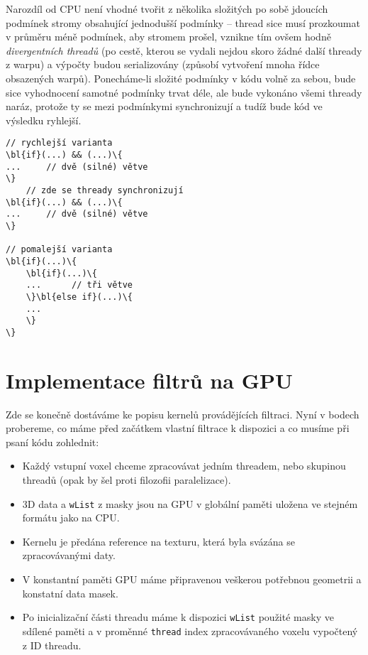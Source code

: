         Narozdíl od CPU není vhodné tvořit z několika složitých po sobě jdoucích podmínek stromy obsahující jednodušší podmínky -- thread sice musí prozkoumat v průměru méně podmínek, aby stromem prošel, vznikne tím ovšem hodně \emph{divergentních threadů} (po cestě, kterou se vydali nejdou skoro žádné další thready z warpu) a výpočty budou serializovány (způsobí vytvoření mnoha řídce obsazených warpů). Ponecháme-li složité podmínky v kódu volně za sebou, bude sice vyhodnocení samotné podmínky trvat déle, ale bude vykonáno všemi thready naráz, protože ty se mezi podmínkymi synchronizují a tudíž bude kód ve výsledku ryhlejší.
        \begin{Verbatim}[commandchars = \\\{\}]
// rychlejší varianta
\bl{if}(...) && (...)\{
...     // dvě (silné) větve
\}
    // zde se thready synchronizují
\bl{if}(...) && (...)\{
...     // dvě (silné) větve
\}

// pomalejší varianta
\bl{if}(...)\{
    \bl{if}(...)\{
    ...      // tři větve
    \}\bl{else if}(...)\{
    ...
    \}
\}

        \end{Verbatim}

\section{Implementace filtrů na GPU}
    
    Zde se konečně dostáváme ke popisu kernelů provádějících filtraci. Nyní v bodech probereme, co máme před začátkem vlastní filtrace k dispozici a co musíme při psaní kódu zohlednit:
    \begin{itemize}
      \item Každý vstupní voxel chceme zpracovávat jedním threadem, nebo skupinou threadů (opak by šel proti filozofii paralelizace).
      \item 3D data a {\tt wList} z masky jsou na GPU v globální paměti uložena ve stejném formátu jako na CPU.
      \item Kernelu je předána reference na texturu, která byla svázána se zpracovávanými daty.
      \item V konstantní paměti GPU máme připravenou veškerou potřebnou geometrii a konstatní data masek.
      \item Po inicializační části threadu máme k dispozici {\tt wList} použité masky ve sdílené paměti a v proměnné {\tt thread} index zpracovávaného voxelu vypočtený z ID threadu.
    \end{itemize}
    
